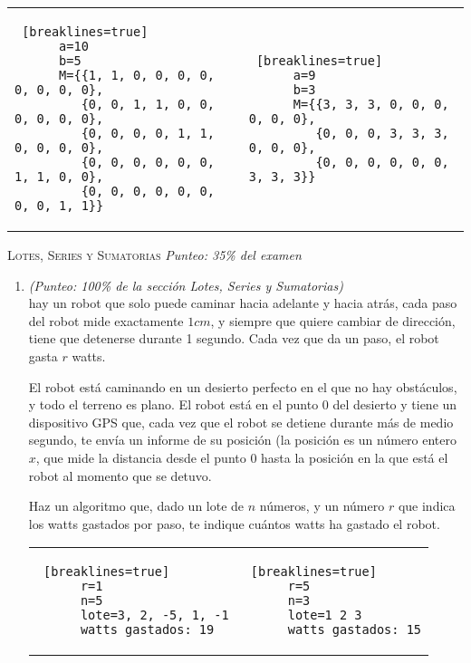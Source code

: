 \documentclass{article}
\begin{document}
\begin{enumerate}
\begin{tabular} {p{8.5cm} p{8.5cm}}
    \begin{lstlisting} [breaklines=true]
      a=10
      b=5
      M={{1, 1, 0, 0, 0, 0, 0, 0, 0, 0},
         {0, 0, 1, 1, 0, 0, 0, 0, 0, 0},
         {0, 0, 0, 0, 1, 1, 0, 0, 0, 0},
         {0, 0, 0, 0, 0, 0, 1, 1, 0, 0},
         {0, 0, 0, 0, 0, 0, 0, 0, 1, 1}}
    \end{lstlisting} &
    
    \begin{lstlisting} [breaklines=true]
      a=9
      b=3
      M={{3, 3, 3, 0, 0, 0, 0, 0, 0},
         {0, 0, 0, 3, 3, 3, 0, 0, 0},
         {0, 0, 0, 0, 0, 0, 3, 3, 3}}
    \end{lstlisting}
    
  \end{tabular}
  
\end{enumerate}

\hrulefill

\textsc{Lotes, Series y Sumatorias} \textit{Punteo: 35\% del examen}

\begin{enumerate}
\item \textit{(Punteo: 100\% de la sección Lotes, Series y Sumatorias)} \\
  hay un robot que solo puede caminar hacia adelante y hacia atrás, cada paso del robot mide exactamente $1cm$, y siempre que quiere cambiar de dirección, tiene que detenerse durante 1 segundo. Cada vez que da un paso, el robot gasta $r$ watts.

  El robot está caminando en un desierto perfecto en el que no hay obstáculos,  y todo el terreno es plano. El robot está en el punto 0 del desierto y tiene un dispositivo GPS que, cada vez que el robot se detiene durante más de medio segundo, te envía un informe de su posición (la posición es un número entero $x$, que mide la distancia desde el punto 0 hasta la posición en la que está el robot al momento que se detuvo.

  Haz un algoritmo que, dado un lote de $n$ números, y un número $r$ que indica los watts gastados por paso, te indique cuántos watts ha gastado el robot.
  
  \begin{tabular} {p{8.5cm} p{8.5cm}}
    
    \begin{lstlisting} [breaklines=true]
      r=1
      n=5
      lote=3, 2, -5, 1, -1
      watts gastados: 19
    \end{lstlisting} &
    
    \begin{lstlisting} [breaklines=true]
      r=5
      n=3
      lote=1 2 3
      watts gastados: 15
    \end{lstlisting}
    
  \end{tabular}
  
\end{enumerate}
\end{document}
